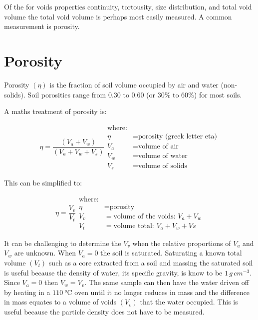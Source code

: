 \documentclass[a5paper]{report}
\begin{document}
Of the for voids properties continuity, tortousity, size distribution, and total void volume the total void volume is perhaps most easily measured. A common measurement is porosity.  

\section{Porosity}

Porosity $\left(\eta\right)$ is the fraction of soil volume occupied by air and water (non-solids). Soil porosities range from 0.30 to 0.60 (or 30\% to 60\%) for most soils.

A maths treatment of porosity is:

\begin{equation}
    \eta = \frac{\left(V_a + V_w\right)}{\left(V_a + V_w + V_s\right)}
    \begin{aligned}
        \text{where:}\\
        \eta &= \text{porosity (greek letter eta)}\\
        V_a &= \text{volume of air}\\
        V_w &= \text{volume of water}\\
        V_s &= \text{volume of solids}
    \end{aligned}
\end{equation}

This can be simplified to:

\begin{equation}
    \eta = \frac{V_v}{V_t}
    \begin{aligned}
        \text{where:}\\
        \eta &= \text{porosity}\\
        V_v &= \text{volume of the voids}:\,V_a+V_w\\
        V_t &= \text{volume total}:\,V_a+V_w+Vs
    \end{aligned}
\end{equation}

It can be challenging to determine the $V_v$ when the relative proportions of $V_a$ and $V_w$ are unknown. When $V_a = 0$ the soil is saturated. Saturating a known total volume $\left(V_t\right)$  such as a core extracted from a soil and massing the saturated soil is useful because the density of water, its specific gravity, is know to be $1\,g\,cm^{-3}$. Since $V_a=0$ then $V_w=V_v$. The same sample can then have the water driven off by heating in a $\SI{110}{\degreeCelsius}$ oven until it no longer reduces in mass and the difference in mass equates to a volume of voids $\left(V_v\right)$ that the water occupied. This is useful because the particle density does not have to be measured.
\end{document}

